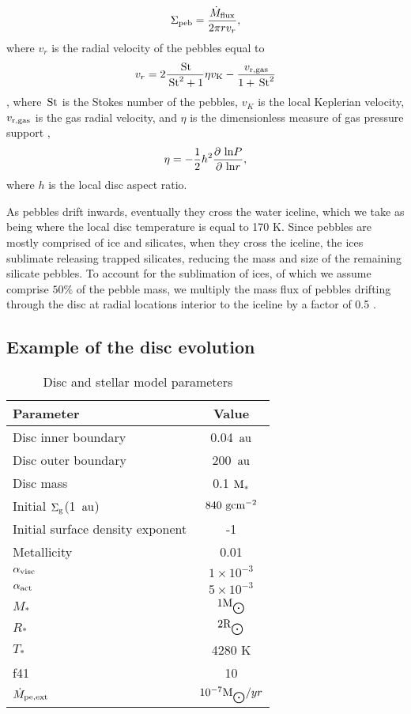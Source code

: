 \documentclass[a4paper,fleqn,usenatbib]{mnras}
\newcommand{\au}{{\, {\rm au}}}
\newcommand{\Stokes}{{\, {\rm St}}}
\begin{document}
\begin{equation}
\label{eq:sigma_peb}
\Sigma_{\rm peb} = \dfrac{\dot{M}_{\rm flux}}{2\pi r v_r},
\end{equation}
where $v_r$ is the radial velocity of the pebbles equal to
\begin{equation}
\label{eq:vr}
v_r = 2\frac{\Stokes}{\Stokes^2+1}\eta v_{\rm K}-\frac{v_{\rm r,gas}}{1+\Stokes^2}
\end{equation}
\citep{Weidenschilling_77,Nakagawa86}, where $\Stokes$ is the Stokes number of the pebbles, $v_K$ is the local Keplerian velocity, $v_{\rm r,gas}$ is the gas radial velocity, and $\eta$ is the dimensionless measure of gas pressure support \citep{Nakagawa86},
\begin{equation}
\eta = -\frac{1}{2}h^2\dfrac{\partial ~{\rm ln} P}{\partial ~{\rm ln} r},
\end{equation}
where $h$ is the local disc aspect ratio.

As pebbles drift inwards, eventually they cross the water iceline, which we take as being where the local disc temperature is equal to 170 K.
Since pebbles are mostly comprised of ice and silicates, when they cross the iceline, the ices sublimate releasing trapped silicates, reducing the mass and size of the remaining silicate pebbles.
To account for the sublimation of ices, of which we assume comprise $50\%$ of the pebble mass, we multiply the mass flux of pebbles drifting through the disc at radial locations interior to the iceline by a factor of 0.5 \citep{Lambrechts14b}.

\subsection{Example of the disc evolution}
\label{sec:disc_example}


\begin{table}
\centering
\begin{tabular}{lc}
\hline
Parameter & Value\\
\hline
Disc inner boundary & 0.04 $\au$\\
Disc outer boundary & 200 $\au$\\
Disc mass & 0.1 $\rm {M_*}$\\
Initial $\Sigma_{\rm g}$(1 $\au$) & $840~ {\rm gcm}^{-2}$\\
Initial surface density exponent & -1\\
Metallicity & 0.01\\
$\alpha_{\rm visc}$ & $1 \times 10^{-3}$\\
$\alpha_{\rm act}$ & $5 \times 10^{-3}$\\
$M_*$ & $1 \rm M_{\bigodot}$\\
$R_*$ & $2 \rm R_{\bigodot}$\\
$T_*$ & 4280 K\\
f41 & 10\\
$\dot{M}_{\rm pe, ext}$ & $10^{-7} {\rm M_{\bigodot}}/yr$\\
\hline
\end{tabular}
\caption{Disc and stellar model parameters}
\label{tab:discparameters}
\end{table}
\end{document}
